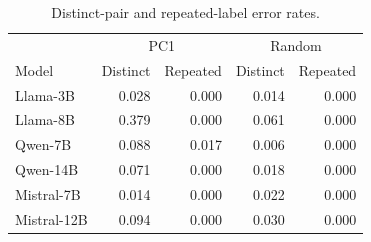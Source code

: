\begin{table}[H]
\centering
\small
\setlength{\tabcolsep}{2pt}
\caption{Distinct-pair and repeated-label error rates.}
\label{tab:frozen-errors}
\begin{tabular*}{\linewidth}{@{\extracolsep{\fill}}lrrrr@{}}
\toprule
& \multicolumn{2}{c}{PC1} & \multicolumn{2}{c}{Random} \\
Model & Distinct & Repeated & Distinct & Repeated \\
\midrule
Llama-3B & 0.028 & 0.000 & 0.014 & 0.000 \\
Llama-8B & 0.379 & 0.000 & 0.061 & 0.000 \\
Qwen-7B & 0.088 & 0.017 & 0.006 & 0.000 \\
Qwen-14B & 0.071 & 0.000 & 0.018 & 0.000 \\
Mistral-7B & 0.014 & 0.000 & 0.022 & 0.000 \\
Mistral-12B & 0.094 & 0.000 & 0.030 & 0.000 \\
\bottomrule
\end{tabular*}
\end{table}
